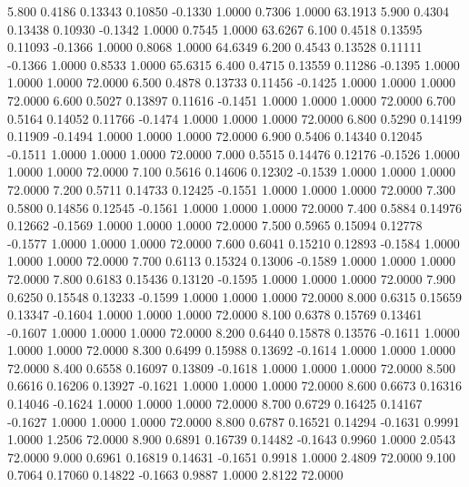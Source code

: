    5.800   0.4186   0.13343   0.10850  -0.1330   1.0000   0.7306   1.0000  63.1913
   5.900   0.4304   0.13438   0.10930  -0.1342   1.0000   0.7545   1.0000  63.6267
   6.100   0.4518   0.13595   0.11093  -0.1366   1.0000   0.8068   1.0000  64.6349
   6.200   0.4543   0.13528   0.11111  -0.1366   1.0000   0.8533   1.0000  65.6315
   6.400   0.4715   0.13559   0.11286  -0.1395   1.0000   1.0000   1.0000  72.0000
   6.500   0.4878   0.13733   0.11456  -0.1425   1.0000   1.0000   1.0000  72.0000
   6.600   0.5027   0.13897   0.11616  -0.1451   1.0000   1.0000   1.0000  72.0000
   6.700   0.5164   0.14052   0.11766  -0.1474   1.0000   1.0000   1.0000  72.0000
   6.800   0.5290   0.14199   0.11909  -0.1494   1.0000   1.0000   1.0000  72.0000
   6.900   0.5406   0.14340   0.12045  -0.1511   1.0000   1.0000   1.0000  72.0000
   7.000   0.5515   0.14476   0.12176  -0.1526   1.0000   1.0000   1.0000  72.0000
   7.100   0.5616   0.14606   0.12302  -0.1539   1.0000   1.0000   1.0000  72.0000
   7.200   0.5711   0.14733   0.12425  -0.1551   1.0000   1.0000   1.0000  72.0000
   7.300   0.5800   0.14856   0.12545  -0.1561   1.0000   1.0000   1.0000  72.0000
   7.400   0.5884   0.14976   0.12662  -0.1569   1.0000   1.0000   1.0000  72.0000
   7.500   0.5965   0.15094   0.12778  -0.1577   1.0000   1.0000   1.0000  72.0000
   7.600   0.6041   0.15210   0.12893  -0.1584   1.0000   1.0000   1.0000  72.0000
   7.700   0.6113   0.15324   0.13006  -0.1589   1.0000   1.0000   1.0000  72.0000
   7.800   0.6183   0.15436   0.13120  -0.1595   1.0000   1.0000   1.0000  72.0000
   7.900   0.6250   0.15548   0.13233  -0.1599   1.0000   1.0000   1.0000  72.0000
   8.000   0.6315   0.15659   0.13347  -0.1604   1.0000   1.0000   1.0000  72.0000
   8.100   0.6378   0.15769   0.13461  -0.1607   1.0000   1.0000   1.0000  72.0000
   8.200   0.6440   0.15878   0.13576  -0.1611   1.0000   1.0000   1.0000  72.0000
   8.300   0.6499   0.15988   0.13692  -0.1614   1.0000   1.0000   1.0000  72.0000
   8.400   0.6558   0.16097   0.13809  -0.1618   1.0000   1.0000   1.0000  72.0000
   8.500   0.6616   0.16206   0.13927  -0.1621   1.0000   1.0000   1.0000  72.0000
   8.600   0.6673   0.16316   0.14046  -0.1624   1.0000   1.0000   1.0000  72.0000
   8.700   0.6729   0.16425   0.14167  -0.1627   1.0000   1.0000   1.0000  72.0000
   8.800   0.6787   0.16521   0.14294  -0.1631   0.9991   1.0000   1.2506  72.0000
   8.900   0.6891   0.16739   0.14482  -0.1643   0.9960   1.0000   2.0543  72.0000
   9.000   0.6961   0.16819   0.14631  -0.1651   0.9918   1.0000   2.4809  72.0000
   9.100   0.7064   0.17060   0.14822  -0.1663   0.9887   1.0000   2.8122  72.0000
